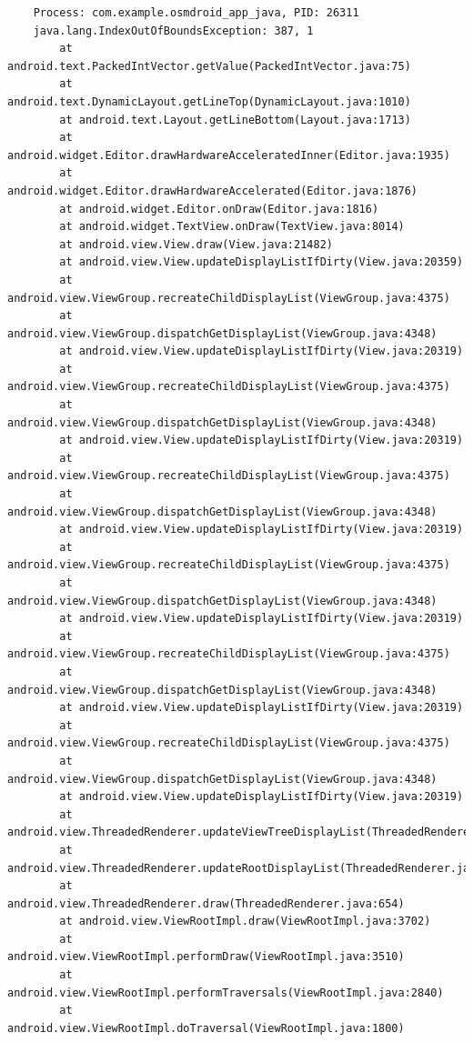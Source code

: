 \documentclass[a4paper,12pt]{book}
\begin{document}
\begin{lstlisting}
    Process: com.example.osmdroid_app_java, PID: 26311
    java.lang.IndexOutOfBoundsException: 387, 1
        at android.text.PackedIntVector.getValue(PackedIntVector.java:75)
        at android.text.DynamicLayout.getLineTop(DynamicLayout.java:1010)
        at android.text.Layout.getLineBottom(Layout.java:1713)
        at android.widget.Editor.drawHardwareAcceleratedInner(Editor.java:1935)
        at android.widget.Editor.drawHardwareAccelerated(Editor.java:1876)
        at android.widget.Editor.onDraw(Editor.java:1816)
        at android.widget.TextView.onDraw(TextView.java:8014)
        at android.view.View.draw(View.java:21482)
        at android.view.View.updateDisplayListIfDirty(View.java:20359)
        at android.view.ViewGroup.recreateChildDisplayList(ViewGroup.java:4375)
        at android.view.ViewGroup.dispatchGetDisplayList(ViewGroup.java:4348)
        at android.view.View.updateDisplayListIfDirty(View.java:20319)
        at android.view.ViewGroup.recreateChildDisplayList(ViewGroup.java:4375)
        at android.view.ViewGroup.dispatchGetDisplayList(ViewGroup.java:4348)
        at android.view.View.updateDisplayListIfDirty(View.java:20319)
        at android.view.ViewGroup.recreateChildDisplayList(ViewGroup.java:4375)
        at android.view.ViewGroup.dispatchGetDisplayList(ViewGroup.java:4348)
        at android.view.View.updateDisplayListIfDirty(View.java:20319)
        at android.view.ViewGroup.recreateChildDisplayList(ViewGroup.java:4375)
        at android.view.ViewGroup.dispatchGetDisplayList(ViewGroup.java:4348)
        at android.view.View.updateDisplayListIfDirty(View.java:20319)
        at android.view.ViewGroup.recreateChildDisplayList(ViewGroup.java:4375)
        at android.view.ViewGroup.dispatchGetDisplayList(ViewGroup.java:4348)
        at android.view.View.updateDisplayListIfDirty(View.java:20319)
        at android.view.ViewGroup.recreateChildDisplayList(ViewGroup.java:4375)
        at android.view.ViewGroup.dispatchGetDisplayList(ViewGroup.java:4348)
        at android.view.View.updateDisplayListIfDirty(View.java:20319)
        at android.view.ThreadedRenderer.updateViewTreeDisplayList(ThreadedRenderer.java:575)
        at android.view.ThreadedRenderer.updateRootDisplayList(ThreadedRenderer.java:581)
        at android.view.ThreadedRenderer.draw(ThreadedRenderer.java:654)
        at android.view.ViewRootImpl.draw(ViewRootImpl.java:3702)
        at android.view.ViewRootImpl.performDraw(ViewRootImpl.java:3510)
        at android.view.ViewRootImpl.performTraversals(ViewRootImpl.java:2840)
        at android.view.ViewRootImpl.doTraversal(ViewRootImpl.java:1800)

\end{lstlisting}
\end{document}
